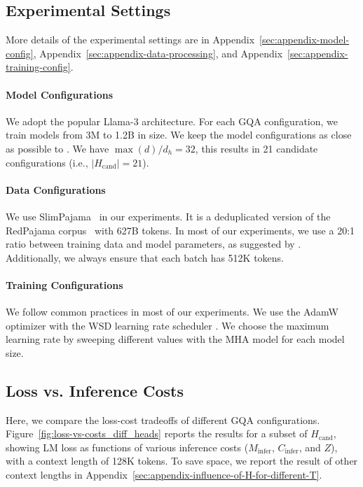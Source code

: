 \documentclass[11pt]{article}
\begin{document}
\subsection{Experimental Settings}
\label{sec:experimental-settings}

More details of the experimental settings are in Appendix~\ref{sec:appendix-model-config},
Appendix~\ref{sec:appendix-data-processing}, and Appendix~\ref{sec:appendix-training-config}.

\paragraph{Model Configurations}

We adopt the popular Llama-3 \citep{llama3} architecture. For each GQA configuration, we train models from 3M to 1.2B in size. We keep the model configurations as close as possible to \citet{pythia}. We have $\max(d)/d_h=32$, this results in 21 candidate configurations (i.e., $|H_\text{cand}|=21$). 

\paragraph{Data Configurations} 

We use SlimPajama~\citep{slimpj} in our experiments. It is a deduplicated version of the RedPajama corpus~\citep{redpajama} with 627B tokens. In most of our experiments, we use a 20:1 ratio between training data and model parameters, as suggested by \citet{chinchilla}. Additionally, we always ensure that each batch has 512K tokens. 

\paragraph{Training Configurations}

We follow common practices in most of our experiments. We use the AdamW optimizer with the WSD learning rate scheduler \citep{minicpm}. We choose the maximum learning rate by sweeping different values with the MHA model for each model size.


\subsection{Loss vs. Inference Costs}
\label{sec:loss-vs-inference-costs}

Here, we compare the loss-cost tradeoffs of different GQA configurations. 
Figure~\ref{fig:loss-vs-costs_diff_heads} reports the results for a subset of $H_\text{cand}$, showing LM loss as functions of various inference costs ($M_\text{infer}$, $C_\text{infer}$, and $Z$), with a context length of 128K tokens. To save space, we report the result of other context lengths in Appendix~\ref{sec:appendix-influence-of-H-for-different-T}.
\end{document}

